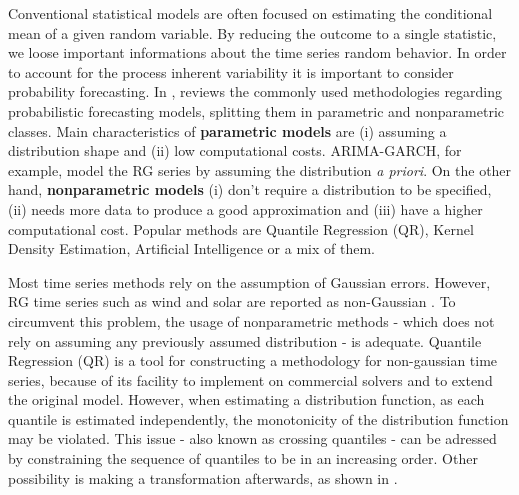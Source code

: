 
Conventional statistical models are often focused on estimating the conditional mean of a given random variable. %
By reducing the outcome to a single statistic, we loose important informations about the time series random behavior. In order to account for the process inherent variability it is important to consider probability forecasting.
In \cite{zhang_review_2014}, reviews the commonly used methodologies regarding probabilistic forecasting models, splitting them in parametric and nonparametric classes. Main characteristics of \textbf{parametric models} are (i) assuming a distribution shape and (ii) low computational costs. ARIMA-GARCH, for example, model the RG series by assuming the distribution \textit{a priori}. On the other hand, \textbf{nonparametric models} (i) don't require a distribution to be specified, (ii) needs more data to produce a good approximation and (iii) have a higher computational cost. Popular methods are Quantile Regression (QR), Kernel Density Estimation,  Artificial Intelligence or a mix of them.


Most time series methods rely on the assumption of Gaussian errors. However, RG time series such as wind and solar are reported as non-Gaussian \cite{bessa2012time,jeon2012using,taylor2015forecasting,Wan2017}. To circumvent this problem, the usage of nonparametric methods - which does not rely on assuming any previously assumed distribution - is adequate. 
Quantile Regression (QR) is a tool for constructing a methodology for non-gaussian time series, because of its facility to implement on commercial solvers and to extend the original model.
However, when estimating a distribution function, as each quantile is estimated independently, the monotonicity of the distribution function may be violated.
This issue - also known as crossing quantiles - can be adressed by constraining the sequence of quantiles to be in an increasing order. Other possibility is making a transformation afterwards, as shown in \cite{chernozhukov_quantile_2010}.

